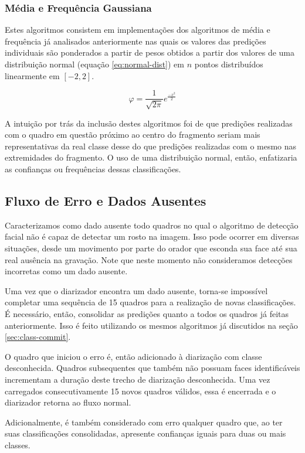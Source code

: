 \subsubsection{Média e Frequência Gaussiana}

Estes algoritmos consistem em implementações dos algoritmos de média e frequência já analisados anteriormente nas quais os valores das predições individuais são ponderados a partir de pesos obtidos a partir dos valores de uma distribuição normal (equação \ref{eq:normal-dist}) em $n$ pontos distribuídos linearmente em $[-2, 2]$.

\begin{equation}\label{eq:normal-dist}
    \varphi = \frac{1}{\sqrt{2\pi}} e ^ {\frac{-x^2}{2}}
\end{equation}

A intuição por trás da inclusão destes algoritmos foi de que predições realizadas com o quadro em questão próximo ao centro do fragmento seriam mais representativas da real classe desse do que predições realizadas com o mesmo nas extremidades do fragmento.
O uso de uma distribuição normal, então, enfatizaria as confianças ou frequências dessas classificações.

\subsection{Fluxo de Erro e Dados Ausentes}
\label{sec:missing-data}

Caracterizamos como dado ausente todo quadros no qual o algoritmo de detecção facial não é capaz de detectar um rosto na imagem.
Isso pode ocorrer em diversas situações, desde um movimento por parte do orador que esconda sua face até sua real ausência na gravação.
Note que neste momento não consideramos detecções incorretas como um dado ausente.

Uma vez que o diarizador encontra um dado ausente, torna-se impossível completar uma sequência de 15 quadros para a realização de novas classificações.
É necessário, então, consolidar as predições quanto a todos os quadros já feitas anteriormente.
Isso é feito utilizando os mesmos algoritmos já discutidos na seção \ref{sec:class-commit}.

O quadro que iniciou o erro é, então adicionado à diarização com classe desconhecida.
Quadros subsequentes que também não possuam faces identificáveis incrementam a duração deste trecho de diarização desconhecida.
Uma vez carregados consecutivamente 15 novos quadros válidos, essa é encerrada e o diarizador retorna ao fluxo normal.

Adicionalmente, é também considerado com erro qualquer quadro que, ao ter suas classificações consolidadas, apresente confianças iguais para duas ou mais classes.